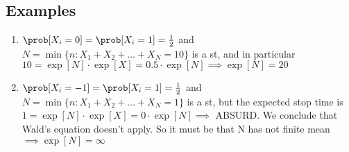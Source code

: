 \subsection{Examples}
	\begin{enumerate}
		\item $\prob[X_i=0]=\prob[X_i = 1] = \frac{1}{2}$ and $N = \min\{n : X_1 + X_2 + \dots + X_N =10\}$ is a \gls{st}, and in particular
		$10 = \exp[N] \cdot \exp[X] = 0.5 \cdot \exp[N] \implies \exp[N]=20$
		\item $\prob[X_i=-1]=\prob[X_i = 1] = \frac{1}{2}$ and $N = \min\{n : X_1 + X_2 + \dots + X_N =1\}$ is a \gls{st}, but the expected stop time
		is $1 = \exp[N] \cdot \exp[X] = 0 \cdot \exp[N] \implies $ ABSURD. We conclude that Wald's equation doesn't apply. So it must be that N has not finite mean $\implies \exp[N]=\infty$
	\end{enumerate}
